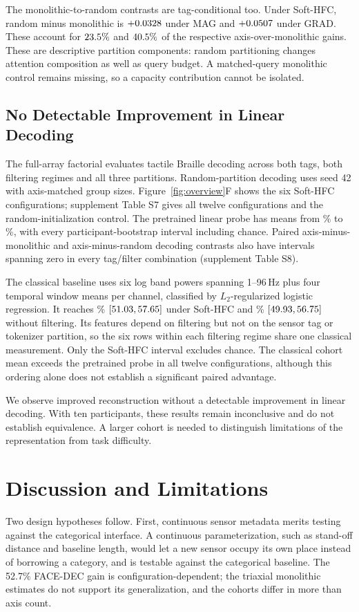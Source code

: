 \documentclass[letterpaper]{article}
\begin{document}
The monolithic-to-random contrasts are tag-conditional too. Under Soft-HFC, random minus monolithic is $+0.0328$ under MAG and $+0.0507$ under GRAD. These account for $23.5\%$ and $40.5\%$ of the respective axis-over-monolithic gains. These are descriptive partition components: random partitioning changes attention composition as well as query budget. A matched-query monolithic control remains missing, so a capacity contribution cannot be isolated.

\subsection{No Detectable Improvement in Linear Decoding}
The full-array factorial evaluates tactile Braille decoding across both tags, both filtering regimes and all three partitions. Random-partition decoding uses seed 42 with axis-matched group sizes. Figure~\ref{fig:overview}F shows the six Soft-HFC configurations; supplement Table S7 gives all twelve configurations and the random-initialization control. The pretrained linear probe has means from \FxProbeMinimum\% to \FxProbeMaximum\%, with every participant-bootstrap interval including chance. Paired axis-minus-monolithic and axis-minus-random decoding contrasts also have intervals spanning zero in every tag/filter combination (supplement Table S8).

The classical baseline uses six log band powers spanning 1--96\,Hz plus four temporal window means per channel, classified by $L_2$-regularized logistic regression. It reaches \FxClassicalSofthfcMean\% $[51.03, 57.65]$ under Soft-HFC and \FxClassicalRawMean\% $[49.93, 56.75]$ without filtering. Its features depend on filtering but not on the sensor tag or tokenizer partition, so the six rows within each filtering regime share one classical measurement. Only the Soft-HFC interval excludes chance. The classical cohort mean exceeds the pretrained probe in all twelve configurations, although this ordering alone does not establish a significant paired advantage.

We observe improved reconstruction without a detectable improvement in linear decoding. With ten participants, these results remain inconclusive and do not establish equivalence. A larger cohort is needed to distinguish limitations of the representation from task difficulty.

\section{Discussion and Limitations}
Two design hypotheses follow. First, continuous sensor metadata merits testing against the categorical interface. A continuous parameterization, such as stand-off distance and baseline length, would let a new sensor occupy its own place instead of borrowing a category, and is testable against the categorical baseline. The 52.7\% FACE-DEC gain is configuration-dependent; the triaxial monolithic estimates do not support its generalization, and the cohorts differ in more than axis count.
\end{document}
